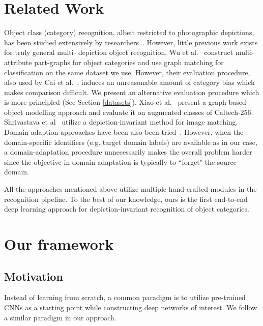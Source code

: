 \documentclass[preprint]{sig-alternate-05-2015}
\begin{document}
\section{Related Work}
\label{sec:relatedwork}

Object class (category) recognition, albeit restricted to photographic depictions, has been studied extensively by researchers~\cite{fergus2003object,fidler2007towards,shotton2008multiscale}.
However, little previous work exists for truly general multi- depiction object recognition. Wu et al.~\cite{wu2014learning} construct  multi-attribute part-graphs for object categories and use graph matching for classification on the same dataset we use. However, their evaluation procedure, also used by Cai et al.~\cite{cai2015cross,cai2015beyond}, induces an unreasonable amount of category bias which makes comparison difficult. We present an alternative evaluation procedure which is more principled (See Section \ref{datasets}). Xiao et al.~\cite{Xiao20111023}
 present a graph-based object modelling approach and evaluate it on  augmented classes of Caltech-256. Shrivastava et al~\cite{shrivastava-sa11} utilize a depiction-invariant method for image matching. Domain adaption approaches have been also been tried~\cite{cai2015beyond}. However, when the domain-specific identifiers (e.g. target domain labels) are available as in our case, a domain-adaptation procedure unnecessarily makes the overall problem harder since the objective in domain-adaptation is typically to ``forget" the source domain. 

All the approaches mentioned above utilize multiple hand-crafted modules in the recognition pipeline. To the best of our knowledge, ours is the first end-to-end deep learning approach for depiction-invariant recognition of object categories.

\section{Our framework}
\label{sec:framework}

\subsection{Motivation}
\label{sec:motivation}

Instead of learning from scratch, a common paradigm is to utilize pre-trained CNNs as a starting point while constructing deep networks of interest. We follow a similar paradigm in our approach. 
\end{document}
